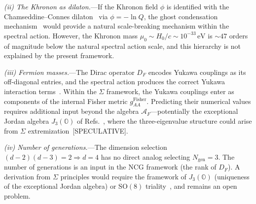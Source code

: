 \emph{(ii) The Khronon as dilaton.}---If
the Khronon field $\phi$ is identified with
the Chamseddine--Connes
dilaton~\cite{CC2006}
via $\phi = -\ln Q$, the ghost
condensation mechanism~\cite{BS2024}
would provide a natural scale-breaking
mechanism within the spectral action.
However, the Khronon mass
$\mu_0 \sim H_0/c \sim 10^{-33}\,\mathrm{eV}$
is $\sim 47$ orders of magnitude below
the natural spectral action scale, and
this hierarchy is not explained by the
present framework.

\emph{(iii) Fermion masses.}---The Dirac
operator $D_F$ encodes Yukawa couplings
as its off-diagonal entries, and the spectral
action produces the correct Yukawa
interaction terms~\cite{CC1996,vS2024}.
Within the $\Sigma$ framework, the Yukawa
couplings enter as components of the
internal Fisher metric
$g_{AA}^{\mathrm{Fisher}}$.
Predicting their numerical values
requires additional input beyond the
algebra $\mathcal{A}_F$---potentially
the exceptional Jordan algebra
$J_3(\mathbb{O})$ of
Refs.~\cite{Singh2025,FureyHughes2024},
where the three-eigenvalue structure
could arise from $\Sigma$
extremization~[SPECULATIVE].

\emph{(iv) Number of generations.}---The
dimension selection $(d-2)(d-3) = 2
\Rightarrow d = 4$ has no direct analog
selecting $N_{\mathrm{gen}} = 3$.
The number of generations is an input in
the NCG framework (the rank of $D_F$).
A derivation from $\Sigma$ principles
would require the framework of $J_3(\mathbb{O})$
(uniqueness of the exceptional Jordan
algebra) or $\mathrm{SO}(8)$
triality~\cite{BaezHuerta2010,FureyHughes2024},
and remains an open problem.



%
%
%
%
%
